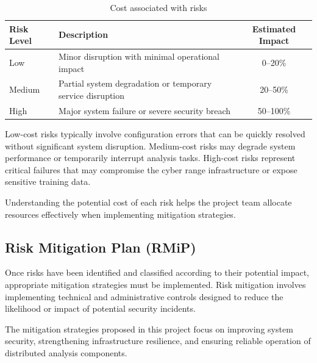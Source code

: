 \begin{table}[H]
    \centering
    \renewcommand{\arraystretch}{1.2}
    \begin{tabularx}{\textwidth}{|X|X|c|}
        \hline
        \textbf{Risk Level} & \textbf{Description} & \textbf{Estimated Impact} \\
        \hline
        Low & Minor disruption with minimal operational impact & 0--20\% \\
        \hline
        Medium & Partial system degradation or temporary service disruption & 20--50\% \\
        \hline
        High & Major system failure or severe security breach & 50--100\% \\
        \hline
    \end{tabularx}
    \caption{Cost associated with risks}
\end{table}

Low-cost risks typically involve configuration errors that can be quickly resolved without significant system disruption. Medium-cost risks may degrade system performance or temporarily interrupt analysis tasks. High-cost risks represent critical failures that may compromise the cyber range infrastructure or expose sensitive training data.

Understanding the potential cost of each risk helps the project team allocate resources effectively when implementing mitigation strategies.

\subsection{Risk Mitigation Plan (RMiP)}
Once risks have been identified and classified according to their potential impact, appropriate mitigation strategies must be implemented. Risk mitigation involves implementing technical and administrative controls designed to reduce the likelihood or impact of potential security incidents.

The mitigation strategies proposed in this project focus on improving system security, strengthening infrastructure resilience, and ensuring reliable operation of distributed analysis components.

